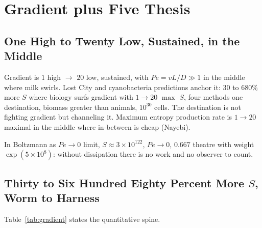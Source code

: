 \documentclass[11pt,a4paper]{article}
\begin{document}
\section{Gradient plus Five Thesis}
\label{sec:gradient}

\subsection{One High to Twenty Low, Sustained, in the Middle}

Gradient is $1$ high $\to$ $20$ low, sustained, with $Pe = vL/D \gg 1$ in the middle where milk swirls. Lost City and cyanobacteria predictions anchor it: $30$ to $680\%$ more $S$ where biology surfs gradient with $1\to 20$ $\max$ $S$, four methods one destination, biomass greater than animals, $10^{30}$ cells. The destination is not fighting gradient but channeling it. Maximum entropy production rate is $1 \to 20$ maximal in the middle where in-between is cheap (Nayebi).

In Boltzmann as $Pe \to 0$ limit, $S \approx 3 \times 10^{122}$, $Pe \to 0$, $0.667$ theatre with weight $\exp(5 \times 10^8)$: without dissipation there is no work and no observer to count.

\subsection{Thirty to Six Hundred Eighty Percent More $S$, Worm to Harness}

Table~\ref{tab:gradient} states the quantitative spine.
\end{document}
